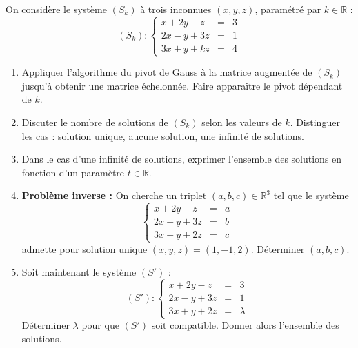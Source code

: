 \documentclass[11pt]{article}
\begin{document}
\begin{exercice}
On considère le système $(S_k)$ à trois inconnues $(x, y, z)$, paramétré par $k \in \mathbb{R}$ :
\[
(S_k) : \left\{
\begin{array}{rcl}
x + 2y - z &=& 3 \\
2x - y + 3z &=& 1 \\
3x + y + kz &=& 4
\end{array}
\right.
\]
\begin{enumerate}
    \item Appliquer l'algorithme du pivot de Gauss à la matrice augmentée de $(S_k)$ jusqu'à obtenir une matrice échelonnée. Faire apparaître le pivot dépendant de $k$.
    \item Discuter le nombre de solutions de $(S_k)$ selon les valeurs de $k$. Distinguer les cas : solution unique, aucune solution, une infinité de solutions.
    \item Dans le cas d'une infinité de solutions, exprimer l'ensemble des solutions en fonction d'un paramètre $t \in \mathbb{R}$.
    \item \textbf{Problème inverse :} On cherche un triplet $(a,b,c) \in \mathbb{R}^3$ tel que le système
    \[
    \left\{
    \begin{array}{rcl}
    x + 2y - z &=& a \\
    2x - y + 3z &=& b \\
    3x + y + 2z &=& c
    \end{array}
    \right.
    \]
    admette pour solution unique $(x,y,z) = (1, -1, 2)$. Déterminer $(a,b,c)$.
    \item Soit maintenant le système $(S')$ :
    \[
    (S') : \left\{
    \begin{array}{rcl}
    x + 2y - z &=& 3 \\
    2x - y + 3z &=& 1 \\
    3x + y + 2z &=& \lambda
    \end{array}
    \right.
    \]
    Déterminer $\lambda$ pour que $(S')$ soit compatible. Donner alors l'ensemble des solutions.
\end{enumerate}
\end{exercice}
\end{document}
